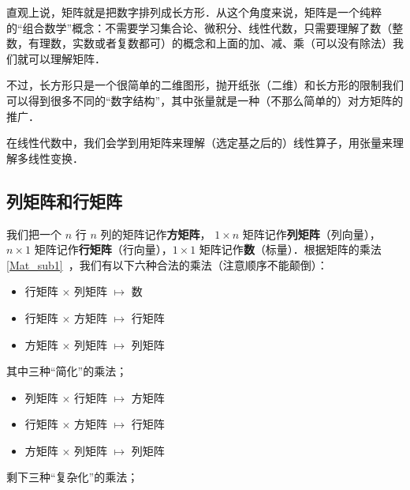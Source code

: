 


直观上说，矩阵就是把数字排列成长方形．从这个角度来说，矩阵是一个纯粹的“组合数学”概念：不需要学习集合论、微积分、线性代数，只需要理解了数（整数，有理数，实数或者复数都可）的概念和上面的加、减、乘（可以没有除法）我们就可以理解矩阵．

不过，长方形只是一个很简单的二维图形，抛开纸张（二维）和长方形的限制我们可以得到很多不同的“数字结构”，其中张量就是一种（不那么简单的）对方矩阵的推广．

在线性代数中，我们会学到用矩阵来理解（选定基之后的）线性算子，用张量来理解多线性变换．

\subsection{列矩阵和行矩阵}
我们把一个 $n$ 行 $n$ 列的矩阵记作\textbf{方矩阵}， $1 \times n$ 矩阵记作\textbf{列矩阵}（列向量），$n \times 1$ 矩阵记作\textbf{行矩阵}（行向量），$1 \times 1$ 矩阵记作\textbf{数}（标量）．根据矩阵的乘法\autoref{Mat_sub1}~，我们有以下六种合法的乘法（注意顺序不能颠倒）：

\begin{itemize}
\item 行矩阵 $\times$ 列矩阵 $\mapsto$ 数
\item 行矩阵 $\times$ 方矩阵 $\mapsto$ 行矩阵
\item 方矩阵 $\times$ 列矩阵 $\mapsto$ 列矩阵
\end{itemize}
其中三种“简化”的乘法；

\begin{itemize}
\item 列矩阵 $\times$ 行矩阵 $\mapsto$ 方矩阵
\item 行矩阵 $\times$ 方矩阵 $\mapsto$ 行矩阵
\item 方矩阵 $\times$ 列矩阵 $\mapsto$ 列矩阵
\end{itemize}
剩下三种“复杂化”的乘法；






